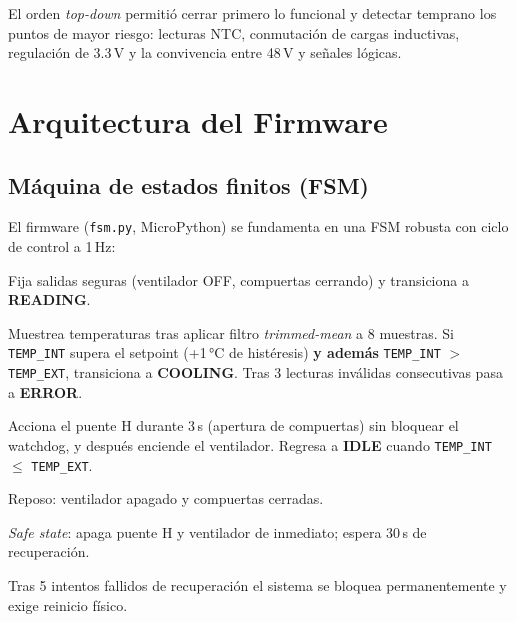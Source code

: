 \documentclass[11pt,letterpaper]{article}
\begin{document}
El orden \emph{top-down} permitió cerrar primero lo funcional y detectar temprano los
puntos de mayor riesgo: lecturas NTC, conmutación de cargas inductivas, regulación de
3.3\,V y la convivencia entre 48\,V y señales lógicas.

\section{Arquitectura del Firmware}

\subsection{Máquina de estados finitos (FSM)}
El firmware (\texttt{fsm.py}, MicroPython) se fundamenta en una FSM robusta con ciclo
de control a 1\,Hz:

\begin{description}[style=nextline]
  \item[INIT] Fija salidas seguras (ventilador OFF, compuertas cerrando) y transiciona a \textbf{READING}.
  \item[READING] Muestrea temperaturas tras aplicar filtro \emph{trimmed-mean} a 8 muestras. Si \texttt{TEMP\_INT} supera el setpoint (+1\,°C de histéresis) \textbf{y además} \texttt{TEMP\_INT} $>$ \texttt{TEMP\_EXT}, transiciona a \textbf{COOLING}. Tras 3 lecturas inválidas consecutivas pasa a \textbf{ERROR}.
  \item[COOLING] Acciona el puente H durante 3\,s (apertura de compuertas) sin bloquear el watchdog, y después enciende el ventilador. Regresa a \textbf{IDLE} cuando \texttt{TEMP\_INT} $\leq$ \texttt{TEMP\_EXT}.
  \item[IDLE] Reposo: ventilador apagado y compuertas cerradas.
  \item[ERROR] \emph{Safe state}: apaga puente H y ventilador de inmediato; espera 30\,s de recuperación.
  \item[LOCKOUT] Tras 5 intentos fallidos de recuperación el sistema se bloquea permanentemente y exige reinicio físico.
\end{description}
\end{document}
